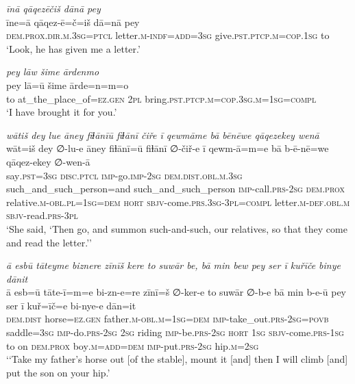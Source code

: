 \ea \label{KŠ.84}
\textit{īnā qāqezēčiš dānā pey} \\ 
\gll īne=ā qāqez-ē=č=iš dā=nā pey \\ 
 \textsc{dem.prox}\textsc{.dir}\textsc{.m}\textsc{.3sg}=\textsc{ptcl} letter\textsc{.m}\textsc{-indf}\textsc{=add}\textsc{=3sg} give\textsc{.pst}\textsc{.ptcp}\textsc{.m}\textsc{=cop}\textsc{.\textsc{1sg}} to \\ 
\glt `Look, he has given me a letter.'
\z 
 
\ea \label{KŠ.85}
\textit{pey lāw šime ārdenmo} \\ 
\gll pey lā=ū šime ārde=n=m=o \\ 
 to at\_the\_place\_of\textsc{\textsc{=ez.gen}} \textsc{2pl} bring\textsc{.pst}\textsc{.ptcp}\textsc{.m}\textsc{=cop}\textsc{.3sg}\textsc{.m}\textsc{=\textsc{1sg}}\textsc{=compl} \\ 
\glt `I have brought it for you.'
\z 
 
\ea \label{KŠ.86}
\textit{wātiš dey lue āney fiɫānīū fiɫānī čiře ī qewmāme bā bēnēwe qāqezekey wenā} \\ 
\gll wāt=iš dey ∅-lu-e āney fiɫānī=ū fiɫānī ∅-čiř-e ī qewm-ā=m=e bā b-ē-nē=we qāqez-ekey ∅-wen-ā \\ 
 say\textsc{.pst}\textsc{=3sg} \textsc{disc.ptcl} \textsc{imp-}go.\textsc{imp-}\textsc{2sg} \textsc{dem.dist}\textsc{.obl}\textsc{.m}\textsc{.3sg} such\_and\_such\_person=and such\_and\_such\_person \textsc{imp-}call\textsc{.prs}-\textsc{2sg} \textsc{dem.prox} relative\textsc{.m}\textsc{-obl}\textsc{.pl}\textsc{=\textsc{1sg}}\textsc{=dem} \textsc{hort} \textsc{sbjv-}come\textsc{.prs}\textsc{.3sg}\textsc{-3pl}\textsc{=compl} letter\textsc{.m}\textsc{-def}\textsc{.obl}\textsc{.m} \textsc{sbjv-}read\textsc{.prs}\textsc{-3pl} \\ 
\glt `She said, ‘Then go, and summon such-and-such, our relatives, so that they come and read the letter.’'
\z 
 
\ea \label{KŠ.96}
\textit{ā esbū tāteyme biznere zīnīš kere to suwār be, bā min bew pey ser ī kuřīče binye dānit} \\ 
\gll ā esb=ū tāte-ī=m=e bi-zn-e=re zīnī=š ∅-ker-e to suwār ∅-b-e bā min b-e-ū pey ser ī kuř=īč=e bi-nye-e dān=it \\ 
 \textsc{dem.dist} horse\textsc{\textsc{=ez.gen}} father\textsc{.m}\textsc{-obl}\textsc{.m}\textsc{=\textsc{1sg}}\textsc{=dem} \textsc{imp-}take\_out\textsc{.prs}-\textsc{2sg}\textsc{=\textsc{povb}} saddle\textsc{=3sg} \textsc{imp-}do\textsc{.prs}-\textsc{2sg} \textsc{2sg} riding \textsc{imp-}be\textsc{.prs}-\textsc{2sg} \textsc{hort} \textsc{1sg} \textsc{sbjv-}come\textsc{.prs}\textsc{-\textsc{1sg}} to on \textsc{dem.prox} boy\textsc{.m}\textsc{=add}\textsc{=dem} \textsc{imp-}put\textsc{.prs}-\textsc{2sg} hip\textsc{.m}\textsc{=\textsc{2sg}} \\ 
\glt `‘Take my father’s horse out [of the stable], mount it [and] then I will climb [and] put the son on your hip.'
\z 
 
